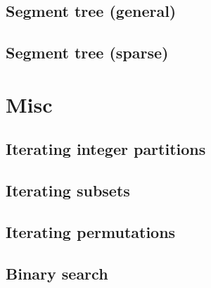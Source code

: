 \documentclass[a4paper,10pt]{article}
\begin{document}
\subsection{Segment tree (general)}

%
\subsection{Segment tree (sparse)}

%
\newpage
\section{Misc}
\subsection{Iterating integer partitions}
\subsection{Iterating subsets}

\subsection{Iterating permutations}

\subsection{Binary search}


\end{document}
